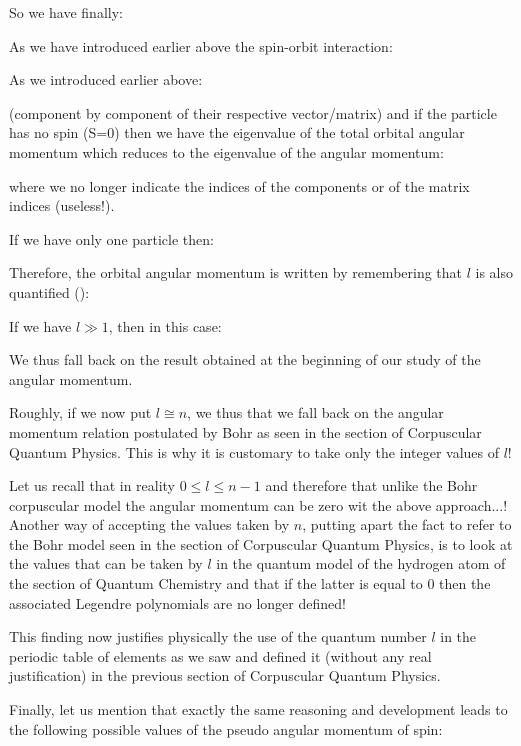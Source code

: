 	So we have finally:
	
	As we have introduced earlier above the spin-orbit interaction:
	
	As we introduced earlier above:
	
	(component by component of their respective vector/matrix) and if the particle has no spin (S=0) then we have the eigenvalue of the total orbital angular momentum which reduces to the eigenvalue of the angular momentum:
	
	where we no longer indicate the indices of the components or of the matrix indices (useless!).
	
	If we have only one particle then:
	
	Therefore, the orbital angular momentum is written by remembering  that $l$ is also quantified ():
	
	If we have $l\gg 1$, then in this case:
	
	We thus fall back on the result obtained at the beginning of our study of the angular momentum.
	
	Roughly, if we now put $l\cong n$, we thus that we fall back on the angular momentum relation postulated by Bohr as seen in the section of Corpuscular Quantum Physics. This is why it is customary to take only the integer values of $l$!
	
	\begin{tcolorbox}[title=Remark,colframe=black,arc=10pt]
	Let us recall that in reality $0\le l \le n-1$ and therefore that unlike the Bohr corpuscular model the angular momentum can be zero wit the above approach...! Another way of accepting the values taken by $n$, putting apart the fact to refer to the Bohr model seen in the section of Corpuscular Quantum Physics, is to look at the values that can be taken by $l$ in the quantum model of the hydrogen atom of the section of Quantum Chemistry and that if the latter is equal to $0$ then the associated Legendre polynomials are no longer defined!
	\end{tcolorbox}
	This finding now justifies physically the use of the quantum number $l$ in the periodic table of elements as we saw and defined it  (without any real justification) in the previous section of Corpuscular Quantum Physics.

	Finally, let us mention that exactly the same reasoning and development leads to the following possible values of the pseudo angular momentum of spin:
	
